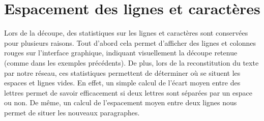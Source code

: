 \section{Espacement des lignes et caractères}

Lors de la découpe, des statistiques sur les lignes et caractères sont
conservées pour plusieurs raisons. Tout d'abord cela permet d'afficher des
lignes et colonnes rouges sur l'interface graphique, indiquant visuellement la
découpe retenue (comme dans les exemples précédents). De plus, lors de la
reconstitution du texte par notre réseau, ces statistiques permettent de
déterminer où se situent les espaces et lignes vides. En effet, un simple calcul
de l'écart moyen entre des lettres permet de savoir efficacement si deux lettres
sont séparées par un espace ou non. De même, un calcul de l'espacement moyen
entre deux lignes nous permet de situer les nouveaux paragraphes.
